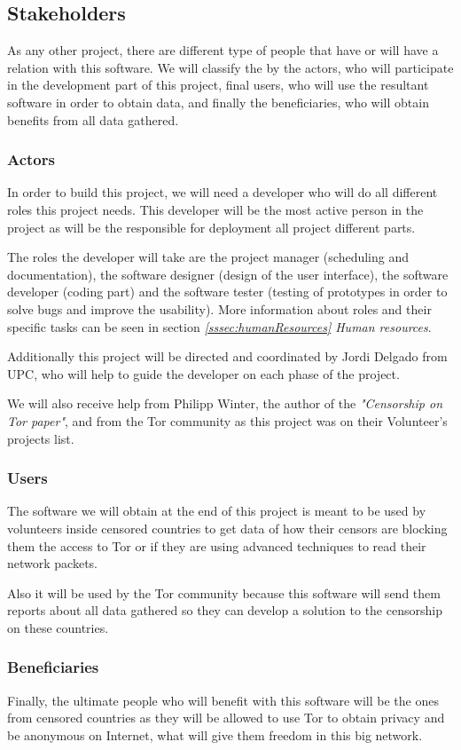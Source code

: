 \subsection{Stakeholders}
As any other project, there are different type of people that have or will have a relation with this software. We will classify the by the actors, who will participate in the development part of this project, final users, who will use the resultant software in order to obtain data, and finally the beneficiaries, who will obtain benefits from all data gathered.

\subsubsection{Actors}
In order to build this project, we will need a developer who will do all different roles this project needs. This developer will be the most active person in the project as will be the responsible for deployment all project different parts.

The roles the developer will take are the project manager (scheduling and documentation), the software designer (design of the user interface), the software developer (coding part) and the software tester (testing of prototypes in order to solve bugs and improve the usability). More information about roles and their specific tasks can be seen in section \textit{\ref{sssec:humanResources} Human resources}.

Additionally this project will be directed and coordinated by Jordi Delgado from UPC, who will help to guide the developer on each phase of the project.

We will also receive help from Philipp Winter, the author of the \textit{"Censorship on Tor paper"}, and from the Tor community as this project was on their Volunteer's projects list.

\subsubsection{Users}
The software we will obtain at the end of this project is meant to be used by volunteers inside censored countries to get data of how their censors are blocking them the access to Tor or if they are using advanced techniques to read their network packets.

Also it will be used by the Tor community because this software will send them reports about all data gathered so they can develop a solution to the censorship on these countries.

\subsubsection{Beneficiaries}
Finally, the ultimate people who will benefit with this software will be the ones from censored countries as they will be allowed to use Tor to obtain privacy and be anonymous on Internet, what will give them freedom in this big network.
